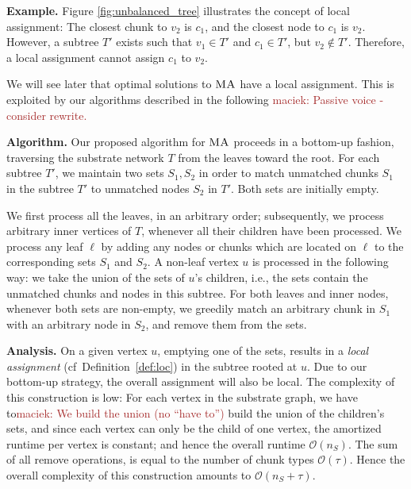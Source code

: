 \documentclass[9pt]{sigcomm-alternate}
\newcommand{\maciek}[1]{\textcolor{brown}{maciek: #1}}
\newcommand{\ChunkType}{\tau}
\newcommand{\MA}{\textsc{MA}}
\newcommand{\Tree}{\ensuremath{T}}
\begin{document}
\textbf{Example.}
Figure \ref{fig:unbalanced_tree} illustrates the concept of local assignment:
The closest chunk to $v_2$ is $c_1$, and the closest node to $c_1$ is $v_2$. 
However, a subtree $T'$ exists such that $v_1 \in T'$ and $c_1
\in T'$, but $v_2 \notin T'$. Therefore, a local assignment cannot assign $c_1$ to $v_2$.



We will see later that
optimal solutions to
$\MA$ have a local assignment. This is exploited by our algorithms described
in the following \maciek{Passive voice - consider rewrite.}

\textbf{Algorithm.} Our proposed algorithm for $\MA$
proceeds in a bottom-up fashion, traversing the substrate network $\Tree$
from the leaves toward the root.
For each subtree $\Tree'$, we maintain
two sets $S_1,S_2$ in order to match unmatched
chunks $S_1$ in the subtree $\Tree'$ to unmatched
nodes $S_2$ in $\Tree'$. Both sets are initially empty.

We first process all the leaves, in an arbitrary order; subsequently, we process arbitrary inner vertices
of $\Tree$, whenever all their children have been processed.
We process any leaf $\ell$
by adding any
nodes or chunks which are located on $\ell$ to the corresponding sets $S_1$ and $S_2$.
A non-leaf vertex $u$ is processed in the following way: we take the union of
the sets of $u$'s children, i.e., the sets contain the unmatched chunks and nodes
in this subtree.
For both leaves and inner nodes, whenever
both sets are non-empty, we greedily match an arbitrary chunk in $S_1$ with an arbitrary node in $S_2$,
and remove them from the sets.

\textbf{Analysis.} On a given vertex $u$, emptying one of the sets, results in a \emph{local assignment} (cf~Definition~\ref{def:loc})
in the
subtree rooted at $u$. Due to our bottom-up strategy, the overall assignment
will also be local.
The complexity of this
construction is low: For each
vertex in the substrate graph,
we have to\maciek{We build the union (no ``have to'')} build the union of the children's sets,
and since each vertex can only be the child of one vertex,
the amortized runtime per vertex is constant; and hence the overall
runtime $\mathcal{O}(n_S)$. The sum of all remove operations, is equal to
the number of chunk types $\mathcal{O}(\ChunkType)$.
Hence the overall complexity of this construction amounts to
$\mathcal{O}(n_S + \ChunkType)$.
\end{document}
